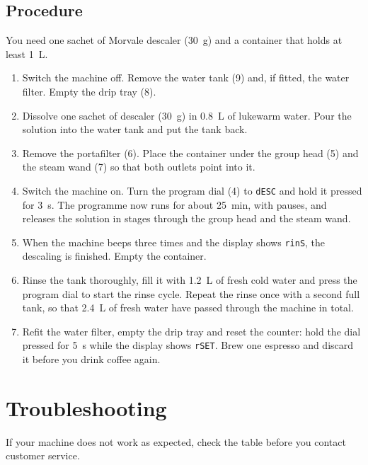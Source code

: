 \documentclass[10pt,a4paper]{article}
\begin{document}
\subsection{Procedure}
You need one sachet of Morvale descaler (\qty{30}{g}) and a container that holds at least \qty{1}{L}.
\begin{enumerate}[leftmargin=4.4em, itemsep=0.25em, label=\textbf{Step \arabic*.}, labelsep=0.6em]
  \item Switch the machine off. Remove the water tank (9) and, if fitted, the water filter. Empty the drip tray (8).
  \item Dissolve one sachet of descaler (\qty{30}{g}) in \qty{0.8}{L} of lukewarm water. Pour the solution
        into the water tank and put the tank back.
  \item Remove the portafilter (6). Place the container under the group head (5) and the steam wand (7) so that
        both outlets point into it.
  \item Switch the machine on. Turn the program dial (4) to \texttt{dESC} and hold it pressed for
        \qty{3}{s}. The programme now runs for about \qty{25}{min}, with pauses, and releases the solution in
        stages through the group head and the steam wand.
  \item When the machine beeps three times and the display shows \texttt{rinS}, the descaling is finished.
        Empty the container.
  \item Rinse the tank thoroughly, fill it with \qty{1.2}{L} of fresh cold water and press the program dial
        to start the rinse cycle. Repeat the rinse once with a second full tank, so that \qty{2.4}{L} of fresh
        water have passed through the machine in total.
  \item Refit the water filter, empty the drip tray and reset the counter: hold the dial pressed for
        \qty{5}{s} while the display shows \texttt{rSET}. Brew one espresso and discard it before you drink coffee again.
\end{enumerate}

\section{Troubleshooting}
If your machine does not work as expected, check the table before you contact customer service.
\end{document}
